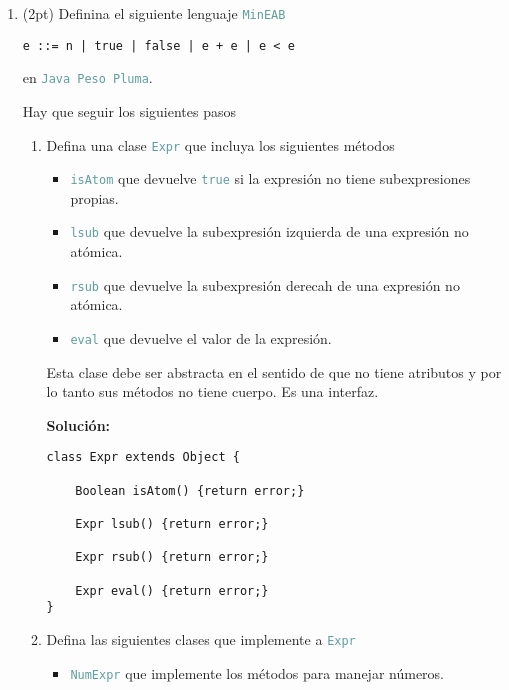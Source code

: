 \documentclass{article}
\newcommand{\tp}[1]{\textcolor{CadetBlue} {\texttt{#1}}}
\newcommand{\tb}[1]{\textcolor{RoyalPurple} {\textbf{#1}}}
\newcommand{\pt}[1]{\textcolor{RoyalPurple}{(#1pt)}}
\begin{document}
\begin{enumerate}
        \item \pt{2} Definina el siguiente lenguaje \tp{MinEAB}

        \begin{verbatim}
e ::= n | true | false | e + e | e < e
        \end{verbatim}

        en \tp{Java Peso Pluma}.

        Hay que seguir los siguientes pasos

        \begin{enumerate}
            \item Defina una clase \tp{Expr} que incluya los siguientes métodos

            \begin{itemize}
                \item \tp{isAtom} que devuelve \tp{true} si la expresión no
                tiene subexpresiones propias.

                \item \tp{lsub} que devuelve la subexpresión izquierda de una
                expresión no atómica.

                \item \tp{rsub} que devuelve la subexpresión derecah de una
                expresión no atómica.

                \item \tp{eval} que devuelve el valor de la expresión.
            \end{itemize}

            Esta clase debe ser abstracta en el sentido de que no tiene
            atributos y por lo tanto sus métodos no tiene cuerpo. Es una
            interfaz.

            \tb{Solución:}

            \begin{verbatim}
class Expr extends Object {

    Boolean isAtom() {return error;}

    Expr lsub() {return error;}

    Expr rsub() {return error;}

    Expr eval() {return error;}
}
            \end{verbatim}

            \item Defina las siguientes clases que implemente a \tp{Expr}

            \begin{itemize}
                \item \tp{NumExpr} que implemente los métodos para manejar
                números.


\end{itemize}
\end{enumerate}
\end{enumerate}
\end{document}
